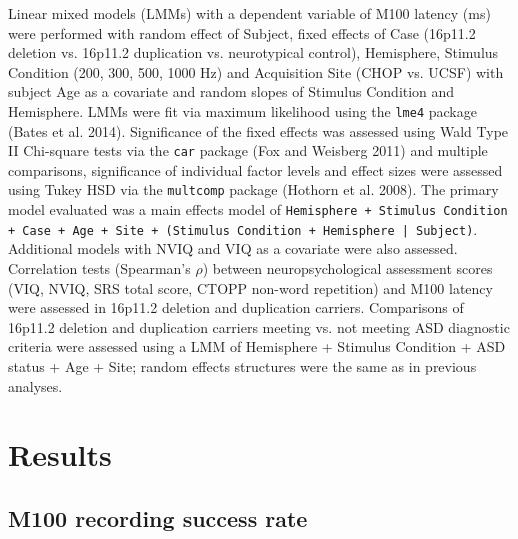 \documentclass{article}
\begin{document}
Linear mixed models (LMMs) with a dependent variable of M100 latency (ms) were performed with random effect of Subject, fixed effects of Case (16p11.2 deletion vs. 16p11.2 duplication vs. neurotypical control), Hemisphere, Stimulus Condition (200, 300, 500, 1000 Hz) and Acquisition Site (CHOP vs. UCSF) with subject Age as a covariate and random slopes of Stimulus Condition and Hemisphere.  LMMs were fit via maximum likelihood using the \texttt{lme4} package (Bates et al. 2014). Significance of the fixed effects was assessed using Wald Type II Chi-square tests via the \texttt{car} package (Fox and Weisberg 2011) and multiple comparisons, significance of individual factor levels and effect sizes were assessed using Tukey HSD via the \texttt{multcomp} package (Hothorn et al. 2008). The primary model evaluated was a main effects model of \texttt{Hemisphere + Stimulus Condition + Case + Age + Site + (Stimulus Condition + Hemisphere | Subject)}. Additional models with NVIQ and VIQ as a covariate were also assessed.  Correlation tests (Spearman’s $\rho$) between neuropsychological assessment scores (VIQ, NVIQ, SRS total score, CTOPP non-word repetition) and M100 latency were assessed in 16p11.2 deletion and duplication carriers.  Comparisons of 16p11.2 deletion and duplication carriers meeting vs. not meeting ASD diagnostic criteria were assessed using a LMM of Hemisphere + Stimulus Condition + ASD status + Age + Site; random effects structures were the same as in previous analyses. 

\medskip

\section*{Results}  
\subsection*{M100 recording success rate}
\end{document}
